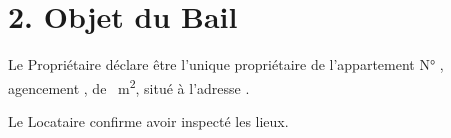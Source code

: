 \section*{2. Objet du Bail}
Le Propriétaire déclare être l'unique propriétaire de l'appartement N° \Propunitnumber, agencement \Propdisposition, de \Propaream~m\textsuperscript{2}, situé à l'adresse \Propaddress.

Le Locataire confirme avoir inspecté les lieux.
